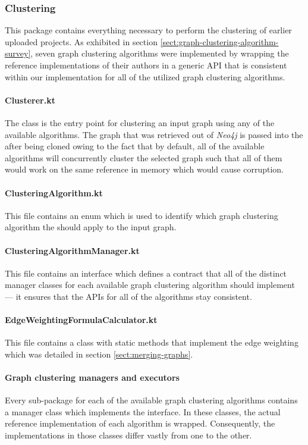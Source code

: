 \documentclass[12pt,a4paper]{report}
\begin{document}
\subsubsection{Clustering}
This package contains everything necessary to perform the clustering of
earlier uploaded projects. As exhibited in section \ref{sect:graph-clustering-algorithm-survey},
seven graph clustering algorithms were implemented by wrapping the reference implementations
of their authors in a generic API that is consistent within our implementation for all
of the utilized graph clustering algorithms.

\paragraph{Clusterer.kt}
The  class is the entry point for clustering an input graph using any of
the available algorithms. The graph that was retrieved out of \textit{Neo4j} is passed into
the  after being cloned owing to the fact that by default, all of the available
algorithms will concurrently cluster the selected graph such that all of them would work
on the same reference in memory which would cause corruption.

\paragraph{ClusteringAlgorithm.kt}
This file contains an enum which is used to identify which graph clustering algorithm
the  should apply to the input graph.

\paragraph{ClusteringAlgorithmManager.kt}
This file contains an interface which defines a contract that all of the distinct manager classes
for each available graph clustering algorithm should implement --- it ensures that the APIs
for all of the algorithms stay consistent.

\paragraph{EdgeWeightingFormulaCalculator.kt}
This file contains a class with static methods that implement the edge weighting which was
detailed in section \ref{sect:merging-graphs}.

\paragraph{Graph clustering managers and executors}
Every sub-package for each of the available graph clustering algorithms contains
a manager class which implements the  interface.
In these classes, the actual reference implementation of each algorithm is wrapped.
Consequently, the implementations in those classes differ vastly from one to the other.
\end{document}
